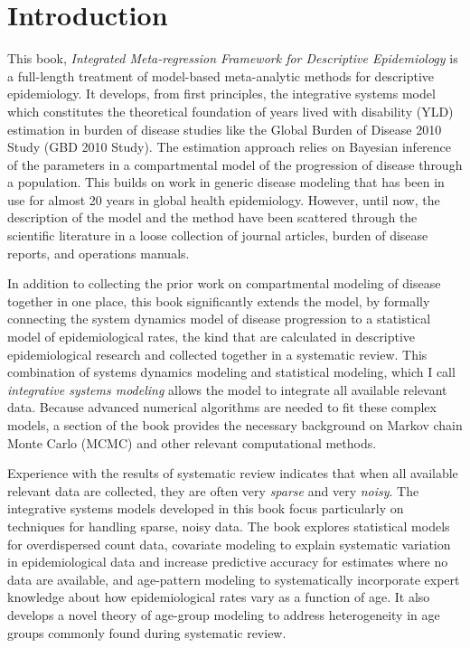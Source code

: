 \section{Introduction}
This book, \emph{Integrated Meta-regression Framework for Descriptive
  Epidemiology} is a full-length treatment of model-based
meta-analytic methods for descriptive epidemiology.  It develops, from
first principles, the integrative systems model which constitutes the
theoretical foundation of years lived with disability (YLD) estimation
in burden of disease studies like the Global Burden of Disease 2010
Study (GBD 2010 Study).  The estimation approach relies on Bayesian
inference of the parameters in a compartmental model of the
progression of disease through a population.  This builds on work in
generic disease modeling that has been in use for almost 20 years
in global health epidemiology. \cite{Barendregt_Generic_2003}
However, until now, the description of the model and the method have
been scattered through the scientific literature in a loose collection
of journal articles, burden of disease reports, and operations
manuals.

In addition to collecting the prior work on compartmental modeling of
disease together in one place, this book significantly extends the
model, by formally connecting the system dynamics model of disease
progression to a statistical model of epidemiological rates, the kind
that are calculated in descriptive epidemiological research and
collected together in a systematic review.  This combination of
systems dynamics modeling and statistical modeling, which I call
\emph{integrative systems modeling} allows the model to integrate all
available relevant data.  Because advanced numerical algorithms are
needed to fit these complex models, a section of the book provides the
necessary background on Markov chain Monte Carlo (MCMC) and other
relevant computational methods.

Experience with the results of systematic review indicates that when
all available relevant data are collected, they are often very
\emph{sparse} and very \emph{noisy}.  The integrative systems models
developed in this book focus particularly on techniques for handling
sparse, noisy data.  The book explores statistical models for
overdispersed count data, covariate modeling to explain
systematic variation in epidemiological data and increase
predictive accuracy for estimates where no data are
available, and age-pattern modeling to systematically incorporate
expert knowledge about how epidemiological rates vary as a function of
age.  It also develops a novel theory of age-group modeling to address
heterogeneity in age groups commonly found during systematic review.

